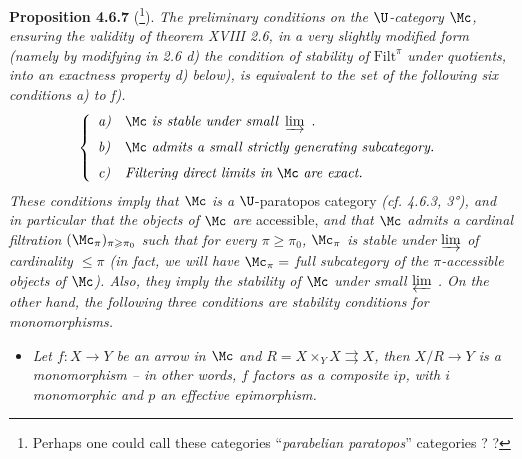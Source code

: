 \textbf{Proposition 4.6.7} (\footnote[62]{Perhaps one could call these categories ``\textit{parabelian paratopos}'' categories ? ?}). \textit{The preliminary conditions on the $\U$-category $\Mc$, ensuring the validity of theorem XVIII 2.6, in a very slightly modified form (namely by modifying in 2.6 d) the condition of stability of} $\mathrm{Filt}^{\pi}$ \textit{under quotients, into an exactness property d) below), is equivalent to the set of the following six conditions a) to f).} %
\[
\left\{
\begin{array}{ll}
\textit{a)} & \Mc\ \textit{is stable under small}\ \varinjlim\ . \\[1.5ex]
\textit{b)} & \Mc\ \textit{admits a small strictly generating subcategory.} \\[1.5ex]
\textit{c)} & \textit{Filtering direct limits in}\ \Mc\ \textit{are exact.}
\end{array}
\right.
\]
\textit{These conditions imply that $\Mc$ is a} $\U$-paratopos category \textit{(cf. 4.6.3, 3°), and in particular that the objects of $\Mc$ are} accessible, \textit{and that $\Mc$ admits a cardinal filtration $(\Mc_{\pi})_{\pi \geqslant \pi_0}$ such that for every $\pi \geqslant \pi_0$, $\Mc_{\pi}$ is stable under $\varinjlim$ of cardinality $\leqslant \pi$ (in fact, we will have $\Mc_{\pi} =$ full subcategory of the $\pi$-accessible objects of $\Mc$). Also, they imply the stability of $\Mc$ under small $\varprojlim$ . On the other hand, the following three conditions are stability conditions for monomorphisms.}
\begin{itemize}[leftmargin=4em]
\item[\textit{d)}] \textit{Let $f : X \longrightarrow Y$ be an arrow in $\Mc$ and $R = X \times_Y X \rightrightarrows X$, then $X/R \longrightarrow Y$ is a monomorphism -- in other words, $f$ factors as a composite $ip$, with $i$ monomorphic and $p$ an effective epimorphism.}
\end{itemize}


